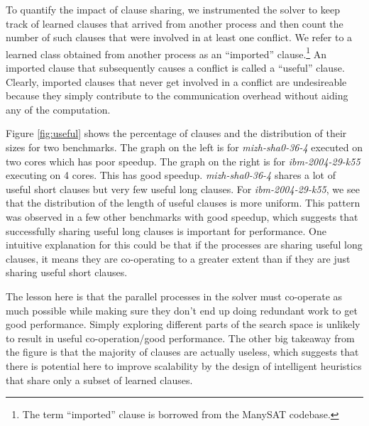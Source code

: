 \documentclass[letterpaper, compsoc, conference]{IEEEtran}
\begin{document}
To quantify the impact of clause sharing, we instrumented the solver to keep
track of learned clauses that arrived from another process and then count the
number of such clauses that were involved in at least one conflict.  We refer
to a learned class obtained from another process as an ``imported''
clause.\footnote{The term ``imported'' clause is borrowed from the ManySAT
codebase.} An imported clause that subsequently causes a conflict is called a
``useful'' clause. Clearly, imported clauses that never get involved in a
conflict are undesireable because they simply contribute to the communication
overhead without aiding any of the computation.

Figure \ref{fig:useful} shows the percentage of clauses and the distribution of
their sizes for two benchmarks. The graph on the left is for
\textit{mizh-sha0-36-4} executed on two cores which has poor speedup. The graph
on the right is for \textit{ibm-2004-29-k55} executing on 4 cores. This has
good speedup. \textit{mizh-sha0-36-4} shares a lot of useful short clauses but
very few useful long clauses. For \textit{ibm-2004-29-k55}, we see that the
distribution of the length of useful clauses is more uniform. This pattern was
observed in a few other benchmarks with good speedup, which suggests that
successfully sharing useful long clauses is important for performance. One
intuitive explanation for this could be that if the processes are sharing
useful long clauses, it means they are co-operating to a greater extent than if
they are just sharing useful short clauses. 

{The lesson here is that the parallel processes in the solver must co-operate
as much possible while making sure they don't end up doing redundant work to
get good performance.} Simply exploring different parts of the search space is
unlikely to result in useful co-operation/good performance. The other big
takeaway from the figure is that the majority of clauses are actually useless,
which suggests that there is potential here to improve scalability by the
design of intelligent heuristics that share only a subset of learned clauses.
\end{document}
